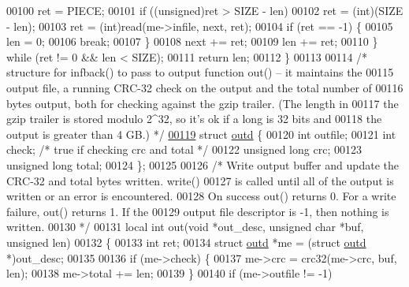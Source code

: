\begin{DoxyCode}
00100         ret = PIECE;
00101         \textcolor{keywordflow}{if} ((\textcolor{keywordtype}{unsigned})ret > SIZE - len)
00102             ret = (\textcolor{keywordtype}{int})(SIZE - len);
00103         ret = (int)read(me->infile, next, ret);
00104         \textcolor{keywordflow}{if} (ret == -1) \{
00105             len = 0;
00106             \textcolor{keywordflow}{break};
00107         \}
00108         next += ret;
00109         len += ret;
00110     \} \textcolor{keywordflow}{while} (ret != 0 && len < SIZE);
00111     \textcolor{keywordflow}{return} len;
00112 \}
00113 
00114 \textcolor{comment}{/* structure for infback() to pass to output function out() -- it maintains the}
00115 \textcolor{comment}{   output file, a running CRC-32 check on the output and the total number of}
00116 \textcolor{comment}{   bytes output, both for checking against the gzip trailer.  (The length in}
00117 \textcolor{comment}{   the gzip trailer is stored modulo 2^32, so it's ok if a long is 32 bits and}
00118 \textcolor{comment}{   the output is greater than 4 GB.) */}
\hyperlink{structoutd}{00119} \textcolor{keyword}{struct }\hyperlink{structoutd}{outd} \{
00120     \textcolor{keywordtype}{int} outfile;
00121     \textcolor{keywordtype}{int} check;                  \textcolor{comment}{/* true if checking crc and total */}
00122     \textcolor{keywordtype}{unsigned} \textcolor{keywordtype}{long} crc;
00123     \textcolor{keywordtype}{unsigned} \textcolor{keywordtype}{long} total;
00124 \};
00125 
00126 \textcolor{comment}{/* Write output buffer and update the CRC-32 and total bytes written.  write()}
00127 \textcolor{comment}{   is called until all of the output is written or an error is encountered.}
00128 \textcolor{comment}{   On success out() returns 0.  For a write failure, out() returns 1.  If the}
00129 \textcolor{comment}{   output file descriptor is -1, then nothing is written.}
00130 \textcolor{comment}{ */}
00131 local \textcolor{keywordtype}{int} out(\textcolor{keywordtype}{void} *out\_desc, \textcolor{keywordtype}{unsigned} \textcolor{keywordtype}{char} *buf, \textcolor{keywordtype}{unsigned} len)
00132 \{
00133     \textcolor{keywordtype}{int} ret;
00134     \textcolor{keyword}{struct }\hyperlink{structoutd}{outd} *me = (\textcolor{keyword}{struct }\hyperlink{structoutd}{outd} *)out\_desc;
00135 
00136     \textcolor{keywordflow}{if} (me->check) \{
00137         me->crc = crc32(me->crc, buf, len);
00138         me->total += len;
00139     \}
00140     \textcolor{keywordflow}{if} (me->outfile != -1)

\end{DoxyCode}

